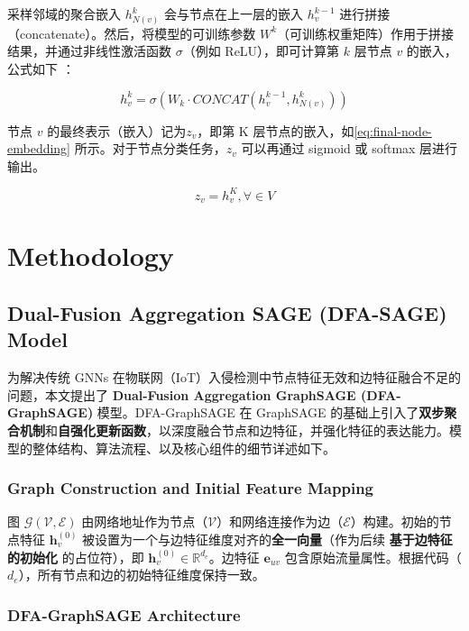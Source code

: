 \documentclass{article}
\begin{document}
采样邻域的聚合嵌入 $h_{N(v)}^k$ 会与节点在上一层的嵌入 $h_v^{k-1}$
进行拼接（concatenate）。然后，将模型的可训练参数 $W^k$（可训练权重矩阵）作用于拼接结果，并通过非线性激活函数
$\sigma$（例如 ReLU），即可计算第 $k$ 层节点 $v$ 的嵌入，公式如下
\cite{hamilton2018inductiverepresentationlearninglarge}：

\begin{equation}
  h_v^k=\sigma ( W_k \cdot CONCAT (h_v^{k-1},h_{N(v)}^k) )
\end{equation}

节点 $v$ 的最终表示（嵌入）记为$z_v$，即第 K 层节点的嵌入，如\eqref{eq:final-node-embedding}
所示。对于节点分类任务，$z_v$ 可以再通过 sigmoid 或 softmax 层进行输出。

\begin{equation}
  z_v=h_v^K, \forall \in V
  \label{eq:final-node-embedding}
\end{equation}
\section{Methodology}

\subsection{Dual-Fusion Aggregation SAGE (DFA-SAGE) Model}

为解决传统 GNNs 在物联网（IoT）入侵检测中节点特征无效和边特征融合不足的问题，本文提出了 \textbf{Dual-Fusion
Aggregation GraphSAGE (DFA-GraphSAGE)} 模型。DFA-GraphSAGE 在 GraphSAGE
的基础上引入了\textbf{双步聚合机制}和\textbf{自强化更新函数}，以深度融合节点和边特征，并强化特征的表达能力。模型的整体结构、算法流程、以及核心组件的细节详述如下。

\subsubsection{Graph Construction and Initial Feature Mapping}

图 $\mathcal{G}(\mathcal{V}, \mathcal{E})$
由网络地址作为节点（$\mathcal{V}$）和网络连接作为边（$\mathcal{E}$）构建。初始的节点特征
$\mathbf{h}_v^{(0)}$ 被设置为一个与边特征维度对齐的\textbf{全一向量}（作为后续
\textbf{基于边特征的初始化} 的占位符），即 $\mathbf{h}_v^{(0)} \in
\mathbb{R}^{d_{e}}$。边特征 $\mathbf{e}_{uv}$
包含原始流量属性。根据代码（$d_{e}$），所有节点和边的初始特征维度保持一致。

\subsubsection{DFA-GraphSAGE Architecture}
\end{document}
